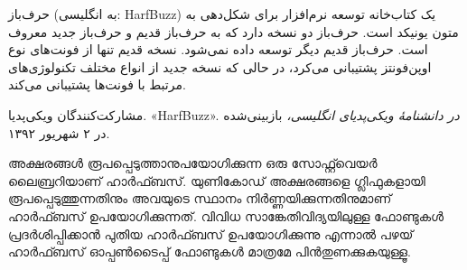 \documentclass{article}
\begin{document}
حرف‌باز (به انگلیسی: HarfBuzz) یک کتاب‌خانه توسعه نرم‌افزار برای
شکل‌دهی به متون یونیکد است. حرف‌باز دو نسخه دارد که به حرف‌باز قدیم و
حرف‌باز جدید معروف است. حرف‌باز قدیم دیگر توسعه داده نمی‌شود. نسخه قدیم
تنها از فونت‌های نوع اوپن‌فونتز پشتیبانی می‌کرد، در حالی که نسخه جدید
از انواع مختلف تکنولوژی‌های مرتبط با فونت‌ها پشتیبانی می‌کند.

\medskip
\small

مشارکت‌کنندگان ویکی‌پدیا. «HarfBuzz». \textit{در دانشنامهٔ ویکی‌پدیای انگلیسی،}
بازبینی‌شده در ۲ شهریور ۱۳۹۲.

\normalsize
\medskip
{}


അക്ഷരങ്ങൾ രൂപപ്പെടുത്താനുപയോഗിക്കുന്ന ഒരു സോഫ്റ്റ്‍വെയർ ലൈബ്രറിയാണ്
ഹാർഫ്ബസ്. യുണികോഡ് അക്ഷരങ്ങളെ ഗ്ലിഫുകളായി രൂപപ്പെടുത്തുന്നതിനും അവയുടെ
സ്ഥാനം നിർണ്ണയിക്കുന്നതിനുമാണ് ഹാർഫ്ബസ് ഉപയോഗിക്കുന്നത്. വിവിധ
സാങ്കേതിവിദ്യയിലുള്ള ഫോണ്ടുകൾ പ്രദർശിപ്പിക്കാൻ പുതിയ ഹാർഫ്ബസ്
ഉപയോഗിക്കുന്നു എന്നാൽ പഴയ് ഹാർഫ്ബസ് ഓപ്പൺടൈപ്പ് ഫോണ്ടുകൾ മാത്രമേ
പിൻതുണക്കുകയുള്ളൂ.
\end{document}
